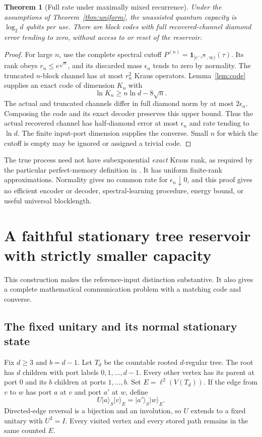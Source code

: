 \documentclass[11pt]{article}
\newtheorem{theorem}{Theorem}[section]
\theoremstyle{definition}\newtheorem{definition}[theorem]{Definition}
\newcommand{\ket}[1]{\lvert #1\rangle}
\begin{document}
\begin{theorem}[Full rate under maximally mixed recurrence]\label{thm:fullrate}
Under the assumptions of Theorem~\ref{thm:uniform}, the unassisted quantum capacity is $\log_2d$ qubits per use. There are block codes with full recovered-channel diamond error tending to zero, without access to or reset of the reservoir.
\end{theorem}
\begin{proof}
For large $n$, use the complete spectral cutoff $P^{(n)}=\mathbf1_{[e^{-\sqrt n},\infty)}(\tau)$. Its rank obeys $r_n\le e^{\sqrt n}$, and its discarded mass $\epsilon_n$ tends to zero by normality. The truncated $n$-block channel has at most $r_n^2$ Kraus operators. Lemma~\ref{lem:code} supplies an exact code of dimension $K_n$ with
\[
 \ln K_n\ge n\ln d-8\sqrt n.
\]
The actual and truncated channels differ in full diamond norm by at most $2\epsilon_n$. Composing the code and its exact decoder preserves this upper bound. Thus the actual recovered channel has half-diamond error at most $\epsilon_n$ and rate tending to $\ln d$. The finite input-port dimension supplies the converse. Small $n$ for which the cutoff is empty may be ignored or assigned a trivial code.
\end{proof}

The true process need not have subexponential \emph{exact} Kraus rank, as required by the particular perfect-memory definition in \cite{GBM}. It has uniform finite-rank approximations. Normality gives no common rate for $\epsilon_n\downarrow0$, and this proof gives no efficient encoder or decoder, spectral-learning procedure, energy bound, or useful universal blocklength.

\section{A faithful stationary tree reservoir with strictly smaller capacity}

This construction makes the reference-input distinction substantive. It also gives a complete mathematical communication problem with a matching code and converse.

\subsection{The fixed unitary and its normal stationary state}

Fix $d\ge3$ and $b=d-1$. Let $T_d$ be the countable rooted $d$-regular tree. The root has $d$ children with port labels $0,1,\ldots,d-1$. Every other vertex has its parent at port $0$ and its $b$ children at ports $1,\ldots,b$. Set $E=\ell^2(V(T_d))$. If the edge from $v$ to $w$ has port $a$ at $v$ and port $a'$ at $w$, define
\begin{equation}
 U\ket{a}_S\ket v_E=\ket{a'}_S\ket w_E.\label{eq:treeU}
\end{equation}
Directed-edge reversal is a bijection and an involution, so $U$ extends to a fixed unitary with $U^2=I$. Every visited vertex and every stored path remains in the same counted $E$.
\end{document}
